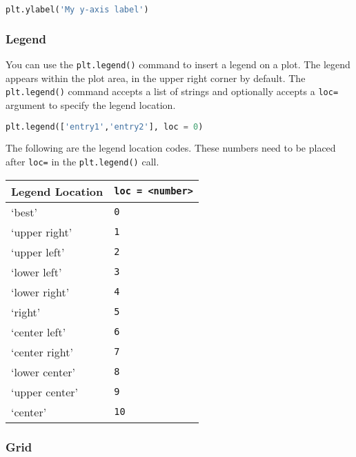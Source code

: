 \documentclass{book}
\newcommand{\passthrough}[1]{#1}
\begin{document}
\begin{lstlisting}[language=Python]
plt.ylabel('My y-axis label')
\end{lstlisting}
    




    
        \hypertarget{legend}{%
\subsubsection{Legend}\label{legend}}

You can use the \passthrough{\lstinline!plt.legend()!} command to insert
a legend on a plot. The legend appears within the plot area, in the
upper right corner by default. The
\passthrough{\lstinline!plt.legend()!} command accepts a list of strings
and optionally accepts a \passthrough{\lstinline!loc=!} argument to
specify the legend location.

\begin{lstlisting}[language=Python]
plt.legend(['entry1','entry2'], loc = 0)
\end{lstlisting}

The following are the legend location codes. These numbers need to be
placed after \passthrough{\lstinline!loc=!} in the
\passthrough{\lstinline!plt.legend()!} call.

\begin{longtable}[]{@{}ll@{}}
\toprule
Legend Location &
\passthrough{\lstinline!loc = <number>!}\tabularnewline
\midrule
\endhead
`best' & \passthrough{\lstinline!0!}\tabularnewline
`upper right' & \passthrough{\lstinline!1!}\tabularnewline
`upper left' & \passthrough{\lstinline!2!}\tabularnewline
`lower left' & \passthrough{\lstinline!3!}\tabularnewline
`lower right' & \passthrough{\lstinline!4!}\tabularnewline
`right' & \passthrough{\lstinline!5!}\tabularnewline
`center left' & \passthrough{\lstinline!6!}\tabularnewline
`center right' & \passthrough{\lstinline!7!}\tabularnewline
`lower center' & \passthrough{\lstinline!8!}\tabularnewline
`upper center' & \passthrough{\lstinline!9!}\tabularnewline
`center' & \passthrough{\lstinline!10!}\tabularnewline
\bottomrule
\end{longtable}
    




    
        \hypertarget{grid}{%
\subsubsection{Grid}\label{grid}}
\end{document}
